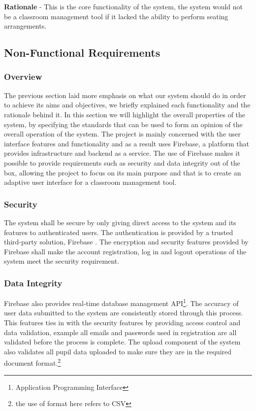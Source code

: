 \textbf{Rationale} - This is the core functionality of the system, the system would not be a classroom management tool if it lacked the ability to perform seating arrangements.

\subsection{Non-Functional Requirements}
\subsubsection{Overview}
The previous section laid more emphasis on what our system should do in order to achieve its aims and objectives, we briefly explained each functionality and the rationale behind it. In this section we will highlight the overall properties of the system, by specifying the standards that can be used to form an opinion of the overall operation of the system. The project is mainly concerned with the user interface features and functionality and as a result uses Firebase\cite{website:Firebase}, a platform that provides infrastructure and backend as a service. The use of Firebase makes it possible to provide requirements such as security and data integrity out of the box, allowing the project to focus on its main purpose and that is to create an adaptive user interface for a classroom management tool.

\subsubsection{Security}
The system shall be secure by only giving direct access to the system and its features to authenticated users. The authentication is provided by a trusted third-party solution, Firebase \cite{website:Firebase}. The encryption and security features provided by Firebase shall make the account registration, log in and logout operations of the system meet the security requirement.

\subsubsection{Data Integrity}
Firebase also provides real-time database management API\footnote{Application Programming Interface}. The accuracy of user data submitted to the system are consistently stored through this process. This features ties in with the security features by providing access control and data validation, example all emails and passwords used in registration are all validated before the process is complete. The upload component of the system also validates all pupil data uploaded to make sure they are in the required document format.\footnote{the use of format here refers to CSV}

